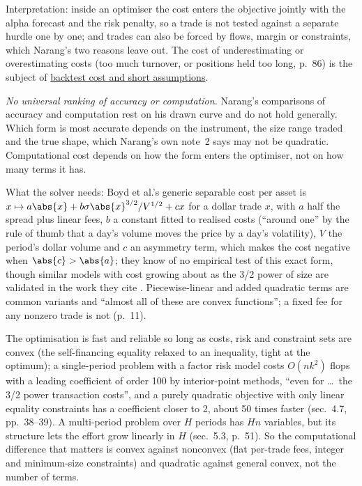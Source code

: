 \begin{qfmodel}
Interpretation: inside an optimiser the cost enters the objective jointly with the alpha forecast and the risk penalty, so a trade is not tested against a separate hurdle one by one; and trades can also be forced by flows, margin or constraints, which Narang's two reasons leave out. The cost of underestimating or overestimating costs (too much turnover, or positions held too long, p.~86) is the subject of \hyperref[pit:backtest-cost-short-assumptions]{backtest cost and short assumptions}.

 \emph{No universal ranking of accuracy or computation.} Narang's comparisons of accuracy and computation rest on his drawn curve and do not hold generally. Which form is most accurate depends on the instrument, the size range traded and the true shape, which Narang's own note~2 says may not be quadratic. Computational cost depends on how the form enters the optimiser, not on how many terms it has.

What the solver needs: Boyd et al.'s generic separable cost per asset is $x\mapsto a\abs{x}+b\sigma\abs{x}^{3/2}/V^{1/2}+cx$ for a dollar trade $x$, with $a$ half the spread plus linear fees, $b$ a constant fitted to realised costs (``around one'' by the rule of thumb that a day's volume moves the price by a day's volatility), $V$ the period's dollar volume and $c$ an asymmetry term, which makes the cost negative when $\abs{c}>\abs{a}$; they know of no empirical test of this exact form, though similar models with cost growing about as the 3/2 power of size are validated in the work they cite \citep[sec.~2.3, eq.~(2.2), pp.~9--10]{exp-boyd-multiperiod-trading}. Piecewise-linear and added quadratic terms are common variants and ``almost all of these are convex functions''; a fixed fee for any nonzero trade is not (p.~11).

The optimisation is fast and reliable so long as costs, risk and constraint sets are convex (the self-financing equality relaxed to an inequality, tight at the optimum); a single-period problem with a factor risk model costs $O(nk^2)$ flops with a leading coefficient of order 100 by interior-point methods, ``even for \dots\ the 3/2 power transaction costs'', and a purely quadratic objective with only linear equality constraints has a coefficient closer to 2, about 50 times faster (sec.~4.7, pp.~38--39). A multi-period problem over $H$ periods has $Hn$ variables, but its structure lets the effort grow linearly in $H$ (sec.~5.3, p.~51). So the computational difference that matters is convex against nonconvex (flat per-trade fees, integer and minimum-size constraints) and quadratic against general convex, not the number of terms.


\end{qfmodel}
